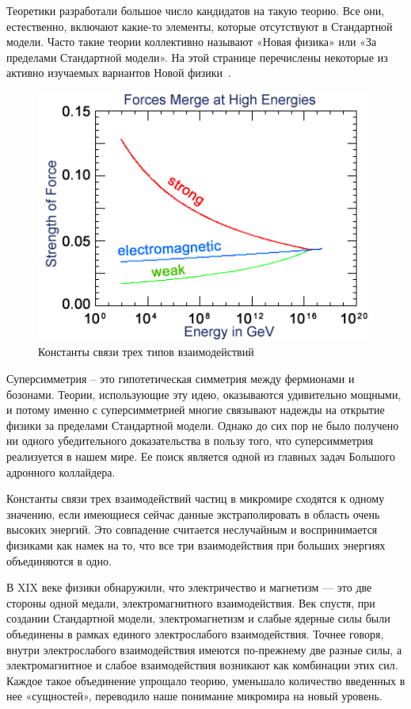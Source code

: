 Теоретики разработали большое число кандидатов на такую теорию. Все они, естественно, включают какие-то элементы, которые отсутствуют в Стандартной модели. Часто такие теории коллективно называют «Новая физика» или «За пределами Стандартной модели». На этой странице перечислены некоторые из активно изучаемых вариантов Новой физики~\cite{2part-1}.

\begin{figure}[h]
	\centering
	\includegraphics[width=\textwidth]{figures/hep-sm.png}
	\caption{Константы связи трех типов взаимодействий}
	\label{fig:fig01}
\end{figure}

Суперсимметрия -- это гипотетическая симметрия между фермионами и бозонами. Теории, использующие эту идею, оказываются удивительно мощными, и потому именно с суперсимметрией многие связывают надежды на открытие физики за пределами Стандартной модели. Однако до сих пор не было получено ни одного убедительного доказательства в пользу того, что суперсимметрия реализуется в нашем мире. Ее поиск является одной из главных задач Большого адронного коллайдера.

Константы связи трех взаимодействий частиц в микромире сходятся к одному значению, если имеющиеся сейчас данные экстраполировать в область очень высоких энергий. Это совпадение считается неслучайным и воспринимается физиками как намек на то, что все три взаимодействия при больших энергиях объединяются в одно.

В XIX веке физики обнаружили, что электричество и магнетизм — это две стороны одной медали, электромагнитного взаимодействия. Век спустя, при создании Стандартной модели, электромагнетизм и слабые ядерные силы были объединены в рамках единого электрослабого взаимодействия. Точнее говоря, внутри электрослабого взаимодействия имеются по-прежнему две разные силы, а электромагнитное и слабое взаимодействия возникают как комбинации этих сил. Каждое такое объединение упрощало теорию, уменьшало количество введенных в нее «сущностей», переводило наше понимание микромира на новый уровень.

